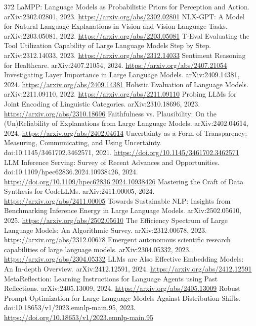 \documentclass[11pt]{article}
\begin{document}
\begin{thebibliography}{372}
 LaMPP: Language Models as Probabilistic Priors for Perception and Action. arXiv:2302.02801, 2023. \url{https://arxiv.org/abs/2302.02801}
 NLX-GPT: A Model for Natural Language Explanations in Vision and Vision-Language Tasks. arXiv:2203.05081, 2022. \url{https://arxiv.org/abs/2203.05081}
 T-Eval Evaluating the Tool Utilization Capability of Large Language Models Step by Step. arXiv:2312.14033, 2023. \url{https://arxiv.org/abs/2312.14033}
 Sentiment Reasoning for Healthcare. arXiv:2407.21054, 2024. \url{https://arxiv.org/abs/2407.21054}
 Investigating Layer Importance in Large Language Models. arXiv:2409.14381, 2024. \url{https://arxiv.org/abs/2409.14381}
 Holistic Evaluation of Language Models. arXiv:2211.09110, 2022. \url{https://arxiv.org/abs/2211.09110}
 Probing LLMs for Joint Encoding of Linguistic Categories. arXiv:2310.18696, 2023. \url{https://arxiv.org/abs/2310.18696}
 Faithfulness vs. Plausibility: On the (Un)Reliability of Explanations from Large Language Models. arXiv:2402.04614, 2024. \url{https://arxiv.org/abs/2402.04614}
 Uncertainty as a Form of Transparency: Measuring, Communicating, and Using Uncertainty. doi:10.1145/3461702.3462571, 2021. \url{https://doi.org/10.1145/3461702.3462571}
 LLM Inference Serving: Survey of Recent Advances and Opportunities. doi:10.1109/hpec62836.2024.10938426, 2024. \url{https://doi.org/10.1109/hpec62836.2024.10938426}
 Mastering the Craft of Data Synthesis for CodeLLMs. arXiv:2411.00005, 2024. \url{https://arxiv.org/abs/2411.00005}
 Towards Sustainable NLP: Insights from Benchmarking Inference Energy in Large Language Models. arXiv:2502.05610, 2025. \url{https://arxiv.org/abs/2502.05610}
 The Efficiency Spectrum of Large Language Models: An Algorithmic Survey. arXiv:2312.00678, 2023. \url{https://arxiv.org/abs/2312.00678}
 Emergent autonomous scientific research capabilities of large language models. arXiv:2304.05332, 2023. \url{https://arxiv.org/abs/2304.05332}
 LLMs are Also Effective Embedding Models: An In-depth Overview. arXiv:2412.12591, 2024. \url{https://arxiv.org/abs/2412.12591}
 MetaReflection: Learning Instructions for Language Agents using Past Reflections. arXiv:2405.13009, 2024. \url{https://arxiv.org/abs/2405.13009}
 Robust Prompt Optimization for Large Language Models Against Distribution Shifts. doi:10.18653/v1/2023.emnlp-main.95, 2023. \url{https://doi.org/10.18653/v1/2023.emnlp-main.95}

\end{thebibliography}
\end{document}
